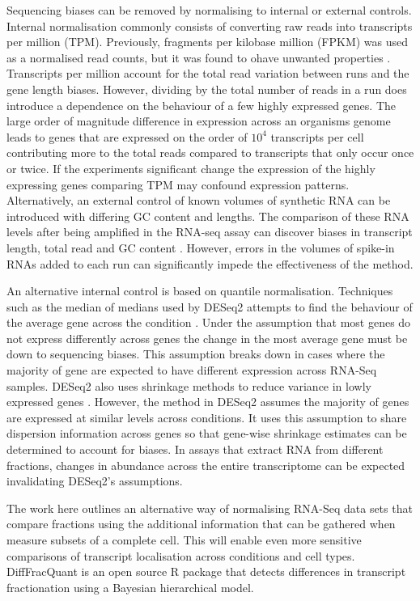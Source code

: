 \documentclass[../main.tex]{subfiles}
\begin{document}
Sequencing biases can be removed by normalising to internal or external controls. 
Internal normalisation commonly consists of converting raw reads into transcripts per million (TPM).
Previously, fragments per kilobase million (FPKM) was used as a normalised read counts, but it was found to ohave unwanted properties \parencite{Wagner2012}.
Transcripts per million account for the total read variation between runs and the gene length biases. 
However, dividing by the total number of reads in a run does introduce a dependence on the behaviour of a few highly expressed genes.
The large order of magnitude difference in expression across an organisms genome leads to genes that are expressed on the order of $10^4$ transcripts per cell contributing more to the total reads compared to transcripts that only occur once or twice. 
If the experiments significant change the expression of the highly expressing genes comparing TPM may confound expression patterns. 
Alternatively, an external control of known volumes of synthetic RNA can be introduced with differing GC content and lengths. 
The comparison of these RNA levels after being amplified in the RNA-seq assay can discover biases in transcript length, total read and GC content \parencite{Evans2018}.
However, errors in the volumes of spike-in RNAs added to each run can significantly impede the effectiveness of the method.

An alternative internal control is based on quantile normalisation.
Techniques such as the median of medians used by DESeq2 attempts to find the behaviour of the average gene across the condition \parencite{Anders2010}.
Under the assumption that most genes do not express differently across genes the change in the most average gene must be down to sequencing biases.
This assumption breaks down in cases where the majority of gene are expected to have different expression across RNA-Seq samples. 
DESeq2 also uses shrinkage methods to reduce variance in lowly expressed genes \parencite{Love2014}.
However, the method in DESeq2 assumes the majority of genes are expressed at similar levels across conditions. 
It uses this assumption to share dispersion information across genes so that gene-wise shrinkage estimates can be determined to account for biases. 
In assays that extract RNA from different fractions, changes in abundance across the entire transcriptome can be expected invalidating DESeq2’s assumptions.


The work here outlines an alternative way of normalising RNA-Seq data sets that compare fractions using the additional information that can be gathered when measure subsets of a complete cell.
This will enable even more sensitive comparisons of transcript localisation across conditions and cell types.
DiffFracQuant is an open source R package that detects differences in transcript fractionation using a Bayesian hierarchical model.
\end{document}
